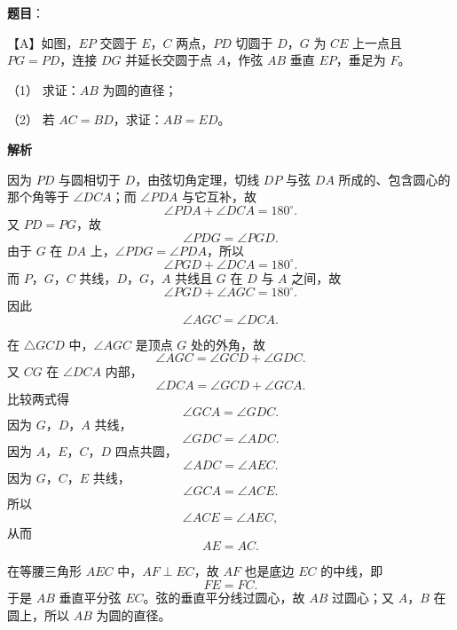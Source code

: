 \begin{answer}

\textbf{题目}：

【A】如图，$EP$ 交圆于 $E$，$C$ 两点，$PD$ 切圆于 $D$，$G$ 为 $CE$ 上一点且 $PG=PD$，连接 $DG$ 并延长交圆于点 $A$，作弦 $AB$ 垂直 $EP$，垂足为 $F$。
\nopagebreak[4]
\begin{center}\end{center}
\nopagebreak[4]
（1） 求证：$AB$ 为圆的直径；

（2） 若 $AC=BD$，求证：$AB=ED$。

\textbf{解析}


因为 $PD$ 与圆相切于 $D$，由弦切角定理，切线 $DP$ 与弦 $DA$ 所成的、包含圆心的那个角等于 $\angle DCA$；而 $\angle PDA$ 与它互补，故
\nopagebreak[4]
\[\angle PDA+\angle DCA=180^\circ.\]
又 $PD=PG$，故
\nopagebreak[4]
\[\angle PDG=\angle PGD.\]
由于 $G$ 在 $DA$ 上，$\angle PDG=\angle PDA$，所以
\nopagebreak[4]
\[\angle PGD+\angle DCA=180^\circ.\]
而 $P$，$G$，$C$ 共线，$D$，$G$，$A$ 共线且 $G$ 在 $D$ 与 $A$ 之间，故
\nopagebreak[4]
\[\angle PGD+\angle AGC=180^\circ.\]
因此
\nopagebreak[4]
\[\angle AGC=\angle DCA.\]

在 $\triangle GCD$ 中，$\angle AGC$ 是顶点 $G$ 处的外角，故
\nopagebreak[4]
\[\angle AGC=\angle GCD+\angle GDC.\]
又 $CG$ 在 $\angle DCA$ 内部，
\nopagebreak[4]
\[\angle DCA=\angle GCD+\angle GCA.\]
比较两式得
\nopagebreak[4]
\[\angle GCA=\angle GDC.\]
因为 $G$，$D$，$A$ 共线，
\nopagebreak[4]
\[\angle GDC=\angle ADC.\]
因为 $A$，$E$，$C$，$D$ 四点共圆，
\nopagebreak[4]
\[\angle ADC=\angle AEC.\]
因为 $G$，$C$，$E$ 共线，
\nopagebreak[4]
\[\angle GCA=\angle ACE.\]
所以
\nopagebreak[4]
\[\angle ACE=\angle AEC,\]
从而
\nopagebreak[4]
\[AE=AC.\]

在等腰三角形 $AEC$ 中，$AF\perp EC$，故 $AF$ 也是底边 $EC$ 的中线，即
\nopagebreak[4]
\[FE=FC.\]
于是 $AB$ 垂直平分弦 $EC$。弦的垂直平分线过圆心，故 $AB$ 过圆心；又 $A$，$B$ 在圆上，所以 $AB$ 为圆的直径。



\end{answer}
